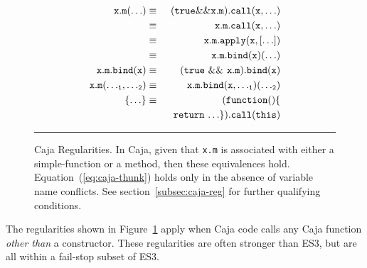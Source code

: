 \documentclass[letterpaper,twocolumn,10pt]{article}
\newcommand{\code}[1]{{\tt {#1}}}              %
\begin{document}
\begin{figure}
\begin{eqnarray}
  \code{x.m(\ldots)}         & \equiv & \code{(true \&\& x.m).call(x,\ldots)}         \label{eq:caja-true-call} \\
                             & \equiv & \code{x.m.call(x,\ldots)}                     \label{eq:caja-call} \\
                             & \equiv & \code{x.m.apply(x,[\ldots])}                  \label{eq:caja-apply} \\
                             & \equiv & \code{x.m.bind(x)(\ldots)}                    \label{eq:caja-bind-1} \\
  \code{x.m.bind(x)}         & \equiv & \code{(true\ \&\&\ x.m).bind(x)}              \label{eq:caja-true-bind} \\ 
  \code{x.m({\ldots}_1,{\ldots}_2)} 
                             & \equiv & \code{x.m.bind(x,{\ldots}_1)({\ldots}_2)}     \label{eq:caja-bind-n} \\
  \code{\{{\ldots}\}}        & \equiv & \code{(function()\{}                          \label{eq:caja-thunk} \\
                             &        & \code{\ \ return\ {\ldots\}}).call(this)}     \nonumber
\end{eqnarray}

\caption[Caja Regularities.]{Caja Regularities. In Caja, given that \code{x.m} is associated with either a 
simple-function or a method, then these equivalences hold. Equation~(\ref{eq:caja-thunk}) holds only in the absence 
of variable name conflicts. 
See section~\ref{subsec:caja-reg} for further qualifying conditions. \\ } \hrule
\label{eqn:caja-regularities}
\end{figure}

The regularities shown in Figure~\ref{eqn:caja-regularities} apply when Caja code calls any Caja function 
\emph{other than} a constructor. These regularities are often stronger than 
ES3, but are all within a fail-stop subset of ES3. 
\end{document}

